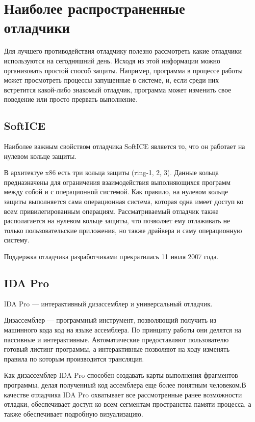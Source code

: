
\section{Наиболее распространенные отладчики}
Для лучшего противодействия отладчику полезно рассмотреть какие отладчики
используются на сегодняшний день. Исходя из этой информации можно организовать
простой способ защиты. Например, программа в процессе работы может просмотреть
процессы запущенные в системе, и, если среди них встретится какой-либо знакомый
отладчик, программа может изменить свое поведение или просто прервать
выполнение.

\subsection{SoftICE}
Наиболее важным свойством отладчика SoftICE является то, что он работает на
нулевом кольце защиты.

В архитектуе x86 есть три кольца защиты (ring-1, 2, 3).
Данные кольца предназначены для ограничения взаимодействия выполняющихся
программ между собой и с операционной системой. Как правило, на нулевом кольце
защиты выполняется сама операционная система, которая одна имеет доступ ко всем
привилегированным операциям. Рассматриваемый отладчик также располагается на
нулевом кольце защиты, что позволяет ему отлаживать не только пользовательские
приложения, но также драйвера и саму операционную систему.

Поддержка отладчика разработчиками прекратилась 11 июля 2007 года.

\subsection{IDA Pro}
IDA Pro --- интерактивный дизассемблер и универсальный отладчик. 

Дизассемблер --- программный инструмент, позволяющий получить из машинного кода
код на языке ассемблера. По принципу работы они делятся на пассивные и
интерактивные. Автоматические предоставляют пользователю готовый листинг
программы, а интерактивные позволяют на ходу изменять правила по которым
производится трансляция.

Как дизассемблер IDA Pro способен создавать карты выполнения фрагментов
программы, делая полученный код ассемблера еще более понятным человеком.В
качестве отладчика IDA Pro охватывает все рассмотренные ранее возможности
отладки, обеспечивает доступ ко всем сегментам пространства памяти процесса, а
также обеспечивает подробную визуализацию.

